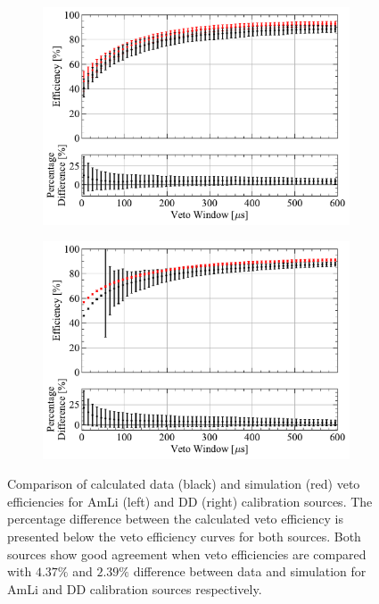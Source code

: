 \begin{figure}[!ht]
    \centering
    \begin{subfigure}[b]{0.49\textwidth}
        \centering
        \includegraphics[width=\textwidth]{figures/VetoEfficiency/AmLi_Total_Avg_Ratio.pdf}
        \caption{}
        \label{fig:VetoEff/Sim2DataVetoEffComparisons_AmLi}
    \end{subfigure}
    \hfill
    \begin{subfigure}[b]{0.49\textwidth}
        \centering
        \includegraphics[width=\textwidth]{figures/VetoEfficiency/DDDirect_Total_Ratio.pdf}
        \caption{}
        \label{fig:VetoEff/Sim2DataVetoEffComparisons_DD}
    \end{subfigure}
    \caption{Comparison of calculated data (black) and simulation (red) veto efficiencies for AmLi (left) and DD (right) calibration sources. The percentage difference between the calculated veto efficiency is presented below the veto efficiency curves for both sources. Both sources show good agreement when veto efficiencies are compared with $4.37\%$ and $2.39\%$ difference between data and simulation for AmLi and DD calibration sources respectively.}
    \label{fig:VetoEff/Sim2DataVetoEffComparisons}
\end{figure}

